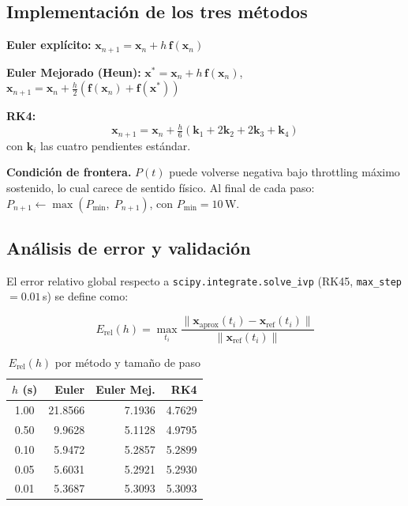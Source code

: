 \documentclass[10pt, twocolumn]{article}
\begin{document}
\subsection{Implementación de los tres métodos}

\medskip\noindent\textbf{Euler explícito:}
$\mathbf{x}_{n+1} = \mathbf{x}_n + h\,\mathbf{f}(\mathbf{x}_n)$

\medskip\noindent\textbf{Euler Mejorado (Heun):}
$\mathbf{x}^* = \mathbf{x}_n + h\,\mathbf{f}(\mathbf{x}_n)$,\quad
$\mathbf{x}_{n+1} = \mathbf{x}_n + \tfrac{h}{2}(\mathbf{f}(\mathbf{x}_n)+\mathbf{f}(\mathbf{x}^*))$

\medskip\noindent\textbf{RK4:}
\begin{equation}
  \mathbf{x}_{n+1} = \mathbf{x}_n
    + \tfrac{h}{6}(\mathbf{k}_1 + 2\mathbf{k}_2 + 2\mathbf{k}_3 + \mathbf{k}_4)
\end{equation}
con $\mathbf{k}_i$ las cuatro pendientes estándar.

\medskip\noindent\textbf{Condición de frontera.} $P(t)$ puede volverse
negativa bajo throttling máximo sostenido, lo cual carece de sentido
físico. Al final de cada paso:
$P_{n+1} \leftarrow \max(P_{\min},\; P_{n+1})$, con $P_\text{min}=10$\,W.

\subsection{Análisis de error y validación}

El error relativo global respecto a \texttt{scipy.integrate.solve\_ivp}
(RK45, \texttt{max\_step}$=0.01$\,s) se define como:

\begin{equation}
  E_\text{rel}(h) = \max_{t_i}
  \frac{\|\mathbf{x}_\text{aprox}(t_i) - \mathbf{x}_\text{ref}(t_i)\|}
       {\|\mathbf{x}_\text{ref}(t_i)\|}
\end{equation}

\begin{table}[H]
\centering
\caption{$E_{\text{rel}}(h)$ por método y tamaño de paso}
\label{tab:error}
\small
\begin{tabular}{@{}crrr@{}}
\toprule
$h$ (s) & Euler & Euler Mej. & RK4 \\
\midrule
1.00  & 21.8566 & 7.1936 & 4.7629 \\
0.50  &  9.9628 & 5.1128 & 4.9795 \\
0.10  &  5.9472 & 5.2857 & 5.2899 \\
0.05  &  5.6031 & 5.2921 & 5.2930 \\
0.01  &  5.3687 & 5.3093 & 5.3093 \\
\bottomrule
\end{tabular}
\end{table}
\end{document}
